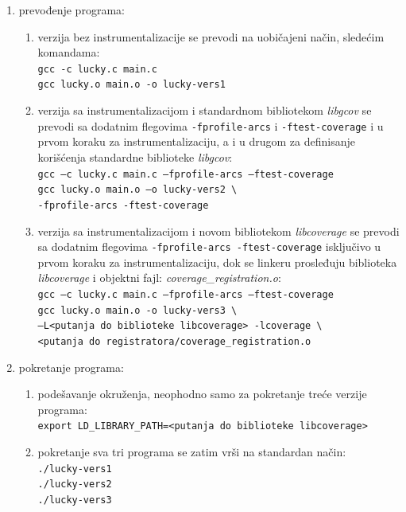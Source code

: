 \documentclass[12pt,oneside]{memoir}
\newcommand{\kod}[1]{\texttt{#1}}
\newcommand{\strano}[1]{\textit{#1}}
\begin{document}
\begin{enumerate}

\item prevođenje programa:
\begin{enumerate}
\item verzija bez instrumentalizacije se prevodi na uobičajeni način, sledećim komandama: \\
\kod{gcc -c lucky.c main.c} \\
\kod{gcc lucky.o main.o -o lucky-vers1}
\item verzija sa instrumentalizacijom i standardnom bibliotekom \strano{libgcov} se prevodi sa dodatnim flegovima \kod{-fprofile-arcs} i \kod{-ftest-coverage} i u prvom koraku za instrumentalizaciju, a i u drugom za definisanje korišćenja standardne biblioteke \strano{libgcov}: \\
\kod{gcc –c lucky.c main.c –fprofile-arcs –ftest-coverage} \\
\kod{gcc lucky.o main.o –o lucky-vers2 \textbackslash} \\
\hspace*{6mm} \kod{-fprofile-arcs -ftest-coverage}
\item verzija sa instrumentalizacijom i novom bibliotekom \strano{libcoverage} se prevodi sa dodatnim flegovima \kod{-fprofile-arcs -ftest-coverage} isključivo u prvom koraku za instrumentalizaciju, dok se linkeru prosleđuju biblioteka \strano{libcoverage} i objektni fajl: \strano{coverage\_registration.o}: \\
\kod{gcc –c lucky.c main.c –fprofile-arcs –ftest-coverage} \\
\kod{gcc lucky.o main.o -o lucky-vers3 \textbackslash} \\ \hspace*{6mm} \kod{–L<putanja do biblioteke libcoverage> -lcoverage \textbackslash} \\
\hspace*{6mm} \kod{<putanja do registratora/coverage\_registration.o}
\end{enumerate}

\item pokretanje programa:
\begin{enumerate}
\item podešavanje okruženja, neophodno samo za pokretanje treće verzije programa: \\
\kod{export LD\_LIBRARY\_PATH=<putanja do biblioteke libcoverage>}
\item pokretanje sva tri programa se zatim vrši na standardan način: \\
\kod{./lucky-vers1} \\
\kod{./lucky-vers2} \\
\kod{./lucky-vers3} \\
\end{enumerate}


\end{enumerate}
\end{document}
